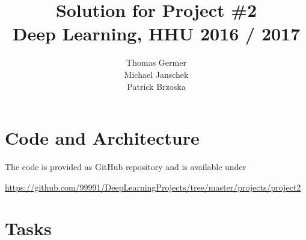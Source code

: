 \documentclass{article}
\title{Solution for Project \#2 \\\large Deep Learning, HHU 2016 / 2017 }
\author{
  Thomas Germer \\
  \And
  Michael Janschek \\
  \And
  Patrick Brzoska \\
}
\begin{document}
\maketitle

\section{Code and Architecture}

The code is provided as GitHub repository and is available under
\begin{center}
	\url{https://github.com/99991/DeepLearningProjects/tree/master/projects/project2}
\end{center}


\newpage

\section{Tasks}
\end{document}
